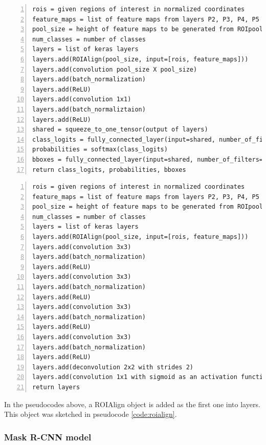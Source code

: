 {\scriptsize
\begin{lstlisting}[style=python, caption={fpn\_classifier\_graph}, captionpos=b, 
label=code:classifier, deletekeywords={from, input, map, in},
backgroundcolor = \color{light-gray}, numbers=left, breaklines=true]
rois = given regions of interest in normalized coordinates
feature_maps = list of feature maps from layers P2, P3, P4, P5
pool_size = height of feature maps to be generated from ROIpooling
num_classes = number of classes
layers = list of keras layers
layers.add(ROIAlign(pool_size, input=[rois, feature_maps]))
layers.add(convolution pool_size X pool_size)
layers.add(batch_normalization)
layers.add(ReLU)
layers.add(convolution 1x1)
layers.add(batch_normaliztaion)
layers.add(ReLU)
shared = squeeze_to_one_tensor(output of layers)
class_logits = fully_connected_layer(input=shared, number_of_filters=num_classes)
probabilities = softmax(class_logits)
bboxes = fully_connected_layer(input=shared, number_of_filters=4 * num_classes)
return class_logits, probabilities, bboxes
\end{lstlisting}}

{\scriptsize
\begin{lstlisting}[style=python, caption={build\_fpn\_maskk\_graph}, 
captionpos=b, label=code:mask, deletekeywords={from, input, map, in},
backgroundcolor = \color{light-gray}, numbers=left, breaklines=true]
rois = given regions of interest in normalized coordinates
feature_maps = list of feature maps from layers P2, P3, P4, P5
pool_size = height of feature maps to be generated from ROIpooling
num_classes = number of classes
layers = list of keras layers
layers.add(ROIAlign(pool_size, input=[rois, feature_maps]))
layers.add(convolution 3x3)
layers.add(batch_normalization)
layers.add(ReLU)
layers.add(convolution 3x3)
layers.add(batch_normalization)
layers.add(ReLU)
layers.add(convolution 3x3)
layers.add(batch_normalization)
layers.add(ReLU)
layers.add(convolution 3x3)
layers.add(batch_normalization)
layers.add(ReLU)
layers.add(deconvolution 2x2 with strides 2)
layers.add(convolution 1x1 with sigmoid as an activation function)
return layers
\end{lstlisting}}

In the pseudocodes above, a ROIAlign object is added as the first one into 
layers. This object was sketched in pseudocode \ref{code:roialign}.

\subsubsection{Mask R-CNN model}
\label{model-mrcnn}


